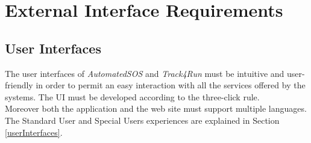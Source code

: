 \section{External Interface Requirements}

\subsection{User Interfaces}
The user interfaces of \textit{AutomatedSOS} and \textit{Track4Run} must be intuitive and user-friendly in order to permit an easy interaction with all the services offered by the systems. The UI must be developed according to the three-click rule.\\
Moreover both the application and the web site must support multiple languages.\\

The Standard User and Special Users experiences are explained in Section \ref{userInterfaces}.

